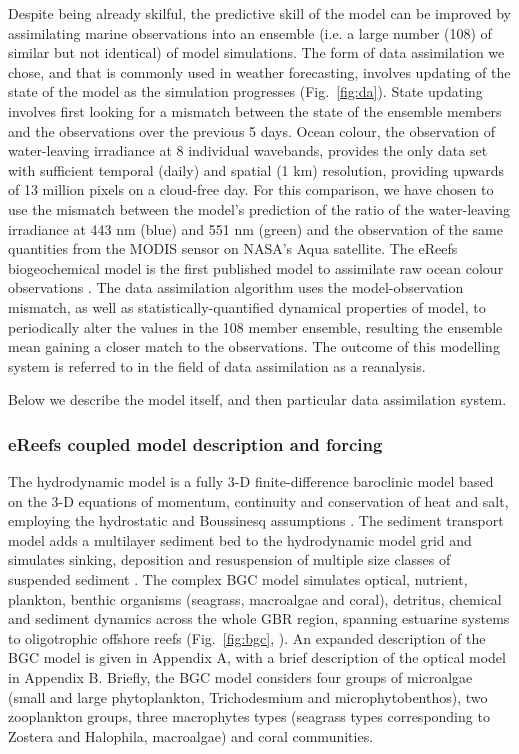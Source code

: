 Despite being already skilful, the predictive skill of the model can be improved by assimilating
marine observations into an ensemble (i.e. a large number (108) of similar but not identical) of
model simulations. The form of data assimilation we chose, and that is commonly used in weather
forecasting, involves updating of the state of the model as the simulation progresses
(Fig.~\ref{fig:da}). State updating involves first looking for a mismatch between the state of the
ensemble members and the observations over the previous 5 days. Ocean colour, the observation of
water-leaving irradiance at 8 individual wavebands, provides the only data set with sufficient
temporal (daily) and spatial (1 km) resolution, providing upwards of 13 million pixels on a
cloud-free day. For this comparison, we have chosen to use the mismatch between the model's
prediction of the ratio of the water-leaving irradiance at 443 nm (blue) and 551 nm (green) and the
observation of the same quantities from the MODIS sensor on NASA's Aqua satellite. The eReefs
biogeochemical model is the first published model to assimilate raw ocean colour observations
\citep{Jones16}. The data assimilation algorithm uses the model-observation mismatch, as well as
statistically-quantified dynamical properties of model, to periodically alter the values in the 108
member ensemble, resulting the ensemble mean gaining a closer match to the observations. The outcome
of this modelling system is referred to in the field of data assimilation as a reanalysis.

Below we describe the model itself, and then particular data assimilation system.

\subsubsection{eReefs coupled model description and forcing}

The hydrodynamic model is a fully 3-D finite-difference baroclinic model based on the 3-D equations
of momentum, continuity and conservation of heat and salt, employing the hydrostatic and Boussinesq
assumptions \citep{Herzfeld06,Herzfeld15a}. The sediment transport model adds a multilayer sediment
bed to the hydrodynamic model grid and simulates sinking, deposition and resuspension of multiple
size classes of suspended sediment \citep{Margvelashvili09,Margvelashvili16}. The complex BGC model
simulates optical, nutrient, plankton, benthic organisms (seagrass, macroalgae and coral), detritus,
chemical and sediment dynamics across the whole GBR region, spanning estuarine systems to
oligotrophic offshore reefs (Fig.~\ref{fig:bgc}, \citet{Baird16a}). An expanded description of the
BGC model is given in Appendix A, with a brief description of the optical model in Appendix
B. Briefly, the BGC model considers four groups of microalgae (small and large phytoplankton,
Trichodesmium and microphytobenthos), two zooplankton groups, three macrophytes types (seagrass
types corresponding to Zostera and Halophila, macroalgae) and coral communities.

